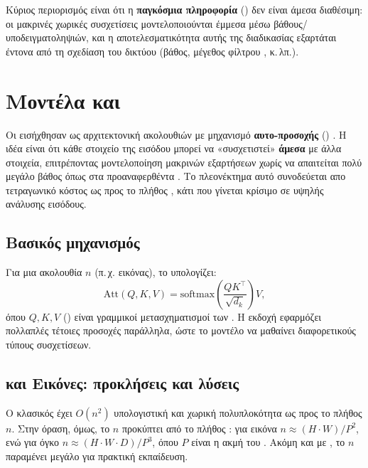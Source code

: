 Κύριος περιορισμός είναι ότι η \textbf{παγκόσμια πληροφορία} () δεν είναι άμεσα διαθέσιμη: οι μακρινές
χωρικές συσχετίσεις μοντελοποιούνται έμμεσα μέσω βάθους/υποδειγματοληψιών, και η αποτελεσματικότητα αυτής της διαδικασίας
εξαρτάται έντονα από τη σχεδίαση του δικτύου (βάθος, μέγεθος φίλτρου , κ.\,λπ.).

\section{Μοντέλα  και }
\label{sec:transformers}

Οι  εισήχθησαν ως αρχιτεκτονική ακολουθιών με μηχανισμό \textbf{αυτο-προσοχής} ()
\cite{vaswani2017attention}. Η ιδέα είναι ότι κάθε στοιχείο της εισόδου μπορεί να «συσχετιστεί» \textbf{άμεσα} με άλλα στοιχεία,
επιτρέποντας μοντελοποίηση μακρινών εξαρτήσεων χωρίς να απαιτείται πολύ μεγάλο βάθος όπως στα προαναφερθέντα .
Το πλεονέκτημα αυτό συνοδεύεται απο τετραγωνικό κόστος ως προς το πλήθος , κάτι που γίνεται κρίσιμο σε υψηλής ανάλυσης  εισόδους.

\subsection{Βασικός μηχανισμός }
Για μια ακολουθία $n$  (π.\,χ.  εικόνας), το  υπολογίζει:
\begin{equation}
\mathrm{Att}(Q,K,V)=\mathrm{softmax}\!\left(\frac{QK^\top}{\sqrt{d_k}}\right)V,
\end{equation}
όπου $Q,K,V$ () είναι γραμμικοί μετασχηματισμοί των .
Η  εκδοχή εφαρμόζει πολλαπλές τέτοιες προσοχές παράλληλα, ώστε το μοντέλο να μαθαίνει διαφορετικούς τύπους
συσχετίσεων.

\subsection{ και Εικόνες: προκλήσεις και λύσεις}
Ο κλασικός  έχει $O(n^2)$ υπολογιστική και χωρική πολυπλοκότητα ως προς το πλήθος  $n$.
Στην όραση, όμως, το $n$ προκύπτει από το πλήθος : για  εικόνα
$n \approx (H\cdot W)/P^2$, ενώ για  όγκο
$n \approx (H\cdot W\cdot D)/P^3$, όπου $P$ είναι η ακμή του .
Ακόμη και με , το $n$ παραμένει μεγάλο για πρακτική  εκπαίδευση.

